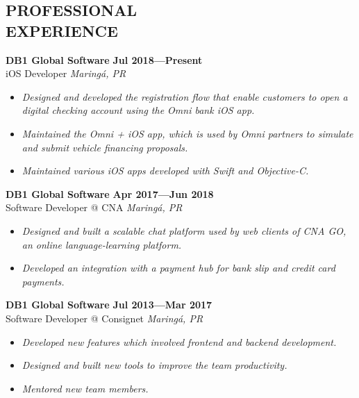 \documentclass[line,margin]{res}
\begin{document}


\address{\sl marcosatanaka.com --- marcosatanaka@gmail.com --- (44) xxxxx - xxxx}


\begin{resume}


\section{PROFESSIONAL \\ EXPERIENCE}
  {\bf DB1 Global Software} \hfill {\bf Jul 2018---Present} \\
  iOS Developer \hfill {\sl Maring\'a, PR}\\[-6pt]
  \begin{itemize}
    \item {\sl Designed and developed the registration flow that enable customers to open a digital checking account using the Omni bank iOS app.}
    \item {\sl Maintained the Omni + iOS app, which is used by Omni partners to simulate and submit vehicle financing proposals.}
    \item {\sl Maintained various iOS apps developed with Swift and Objective-C.}
  \end{itemize}

  {\bf DB1 Global Software} \hfill {\bf Apr 2017---Jun 2018} \\
  Software Developer @ CNA \hfill {\sl Maring\'a, PR}\\[-6pt]
  \begin{itemize}
    \item {\sl Designed and built a scalable chat platform used by web clients of CNA GO,
                    an online language-learning platform.}
    \item {\sl Developed an integration with a payment hub for
               bank slip and credit card payments.}
  \end{itemize}

  {\bf DB1 Global Software} \hfill {\bf Jul 2013---Mar 2017} \\
  Software Developer @ Consignet \hfill {\sl Maring\'a, PR}\\[-6pt]
  \begin{itemize}
    \item {\sl Developed new features which involved
               frontend and backend development.}
    \item {\sl Designed and built new tools to improve the team productivity.}
    \item {\sl Mentored new team members.}
  \end{itemize}


\end{resume}
\end{document}
